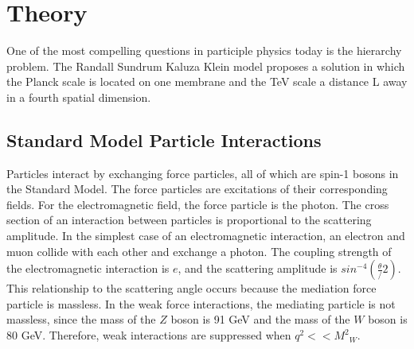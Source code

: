\chapter{Theory}\label{chap:cms}


One of the most compelling questions in participle physics today is the hierarchy problem. The Randall Sundrum Kaluza Klein model proposes a solution in which the Planck scale is located on one membrane and the TeV scale a distance L away in a fourth spatial dimension. 


\section{Standard Model Particle Interactions}

Particles interact by exchanging force particles, all of which are spin-1 bosons in the Standard Model. The force particles are excitations of their corresponding fields. For the electromagnetic field, the force particle is the photon. The cross section of an interaction between particles is proportional to the scattering amplitude. In the simplest case of an electromagnetic interaction, an electron and muon collide with each other and exchange a photon. The coupling strength of the electromagnetic interaction is $e$, and the scattering amplitude is $sin^{-4}(\frac{\theta}/{2})$. This relationship to the scattering angle occurs because the mediation force particle is massless. In the weak force interactions, the mediating particle is not massless, since the mass of the $Z$ boson is 91 GeV and the mass of the $W$ boson is 80 GeV. Therefore, weak interactions are suppressed when $q^2 << {M^{2}}_{W}$.

